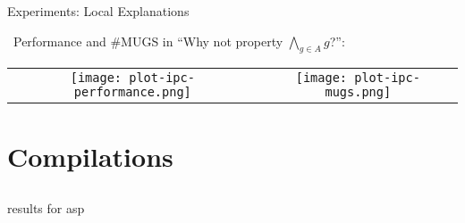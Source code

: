 \begin{frame}{Experiments: Local Explanations}

\notesym~Performance and \#MUGS 
in ``Why not property $\bigwedge_{g \in A} g$?'':

\medskip

\small

\centering

\begin{tabular}{cc}
\begin{minipage}{0.45\textwidth}
\texttt{[image: plot-ipc-performance.png]}
\end{minipage} &
\hspace{0.5cm} \begin{minipage}{0.45\textwidth}
\texttt{[image: plot-ipc-mugs.png]}
\end{minipage}
\end{tabular}

\end{frame}



%

\section[Compilations]{Compilations}
\subsection*{}

\begin{frame}{}

\end{frame}


\begin{frame}{}

results for asp

\end{frame}



%

